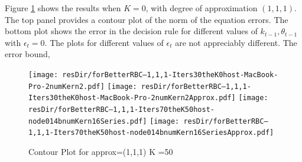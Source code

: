\documentclass[12pt]{article}
\begin{document}



Figure \ref{fig:cntpltA} shows the results when $K=0$, with degree of approximation $(1,1,1)$.  The top panel provides a contour plot of the
norm of the equation errors. The bottom plot shows the error in the decision rule for different values of $k_{t-1}, \theta_{t-1}$ with $\epsilon_t=0$.  The plots for different values of $\epsilon_t$ are not appreciably different. The error bound, 
%  
% 
% 
% 



\begin{figure}
  \centering
\ifmacosx
  \texttt{[image: resDir/forBetterRBC--1,1,1-Iters30theK0host-MacBook-Pro-2numKern2.pdf]}
  \texttt{[image: resDir/forBetterRBC--1,1,1-Iters30theK0host-MacBook-Pro-2numKern2Approx.pdf]}
\fi
\iflinux
  \texttt{[image: resDir/forBetterRBC--1,1,1-Iters70theK50host-node014bnumKern16Series.pdf]}
  \texttt{[image: resDir/forBetterRBC--1,1,1-Iters70theK50host-node014bnumKern16SeriesApprox.pdf]}
\fi
  \caption{Contour Plot for approx=(1,1,1) K =50 }
  \label{fig:cntpltA}
\end{figure}




\end{document}
